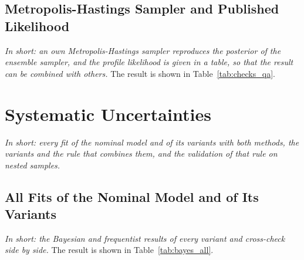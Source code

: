 \subsection{Metropolis-Hastings Sampler and Published Likelihood}
\label{sec:checks_mh}
\emph{In short: an own Metropolis-Hastings sampler reproduces the posterior of the ensemble sampler, and the profile likelihood is given in a table, so that the result can be combined with others.}
The result is shown in Table~\ref{tab:checks_qa}.

\begin{table}[h]
\centering
{}
\caption{Profile likelihood ratio $q(A)=-2\Delta\ln L$ of the nominal fit (other parameters profiled); minimum at $-0.0441$, Minos intervals $[-0.0526,-0.0356]$ ($68\%$) and $[-0.0607,-0.0275]$ ($95\%$).}
\label{tab:checks_qa}
\end{table}

\FloatBarrier

\section{Systematic Uncertainties}
\label{app:syst}
\emph{In short: every fit of the nominal model and of its variants with both methods, the variants and the rule that combines them, and the validation of that rule on nested samples.}
\subsection{All Fits of the Nominal Model and of Its Variants}
\label{sec:syst_tables}
\emph{In short: the Bayesian and frequentist results of every variant and cross-check side by side.}
The result is shown in Table~\ref{tab:bayes_all}.

